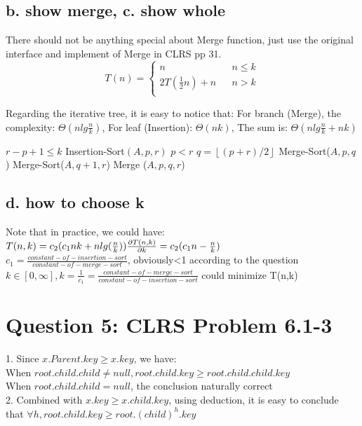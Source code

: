 \documentclass[]{article}
\begin{document}
\subsection{b. show merge, c. show whole}

There should not be anything special about Merge function, just use the original interface and implement of Merge in CLRS pp 31.\\
$$ T(n)=\left\{
\begin{array}{lcl}
 n       &      & {n \le k}\\
2T(\frac{1}{2}n) + n     &      & {n > k}\\
\end{array} \right. $$

Regarding the iterative tree, it is easy to notice that:
For branch (Merge), the complexity: $\Theta(nlg\frac{n}{k})$, For leaf (Insertion): $\Theta(nk)$, The sum is: $\Theta (nlg\frac{n}{k} + nk) $

\begin{codebox}
	\li \If $r-p + 1 \le k$
	\li \Then   Insertion-Sort$(A,p,r)$
	\li 		\Return
	\li \ElseIf $p < r$
	\li \Then	$q = \left \lfloor (p+r)/2 \right \rfloor$
	\li 		Merge-Sort($A, p, q$)
	\li			Merge-Sort($A, q+1, r$)
	\li			Merge ($A, p, q, r$)
	\li			\Return
	\li \Else  \Return
	\End
\end{codebox}

\subsection{d. how to choose k}
Note that in practice, we could have:\\
$T(n,k) = c_{2} (c_{1}nk + nlg(\frac{n}{k}))\\
\frac{\partial T(n,k)}{\partial k} = c_{2} (c_{1}n - \frac{n}{k})$\\
$c_{1} = \frac{constant-of-insertion-sort}{constant-of-merge-sort}$, obviously<1 according to the question\\
$k \in [0, \infty], k = \frac{1}{c_{1}} = \frac{constant-of-merge-sort}{constant-of-insertion-sort} $ could minimize T(n,k)

\section{Question 5: CLRS Problem 6.1-3}
1. Since $x.Parent.key \ge x.key$, we have:\\
When $root.child.child \neq null, root.child.key \ge root.child.child.key$\\
When $root.child.child = null$, the conclusion naturally correct\\
2. Combined with $x.key \ge x.child.key$, using deduction, it is easy to conclude that $\forall h, root.child.key \ge root.(child)^{h}.key$
\end{document}
